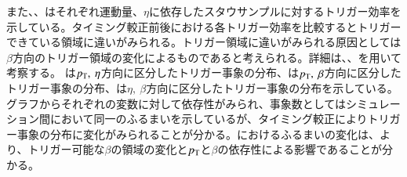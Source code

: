 また、、はそれぞれ運動量、$\eta$に依存したスタウサンプルに対するトリガー効率を示している。タイミング較正前後における各トリガー効率を比較するとトリガーできている領域に違いがみられる。トリガー領域に違いがみられる原因としては$\beta$方向のトリガー領域の変化によるものであると考えられる。詳細は、、を用いて考察する。
は$p_{\rm{T}},~\eta$方向に区分したトリガー事象の分布、は$p_{\rm{T}},~\beta$方向に区分したトリガー事象の分布、は$\eta,~\beta$方向に区分したトリガー事象の分布を示している。グラフからそれぞれの変数に対して依存性がみられ、事象数としてはシミュレーション間において同一のふるまいを示しているが、タイミング較正によりトリガー事象の分布に変化がみられることが分かる。におけるふるまいの変化は、より、トリガー可能な$\beta$の領域の変化と$p_{\rm{T}}$と$\beta$の依存性による影響であることが分かる。 
